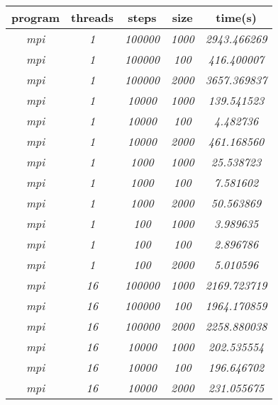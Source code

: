 \documentclass[../main.tex]{subfiles}
\begin{document}
\begin{table}[]
\begin{tabular}{|c|c|c|c|c|}
\hline
\textbf{program} & \textbf{threads} & \textbf{steps}  & \textbf{size} & \textbf{time(s)}     \\ \hline
\textit{mpi}     & \textit{1}       & \textit{100000} & \textit{1000} & \textit{2943.466269} \\
\textit{mpi}     & \textit{1}       & \textit{100000} & \textit{100}  & \textit{416.400007}  \\
\textit{mpi}     & \textit{1}       & \textit{100000} & \textit{2000} & \textit{3657.369837} \\
\textit{mpi}     & \textit{1}       & \textit{10000}  & \textit{1000} & \textit{139.541523}  \\
\textit{mpi}     & \textit{1}       & \textit{10000}  & \textit{100}  & \textit{4.482736}    \\
\textit{mpi}     & \textit{1}       & \textit{10000}  & \textit{2000} & \textit{461.168560}  \\
\textit{mpi}     & \textit{1}       & \textit{1000}   & \textit{1000} & \textit{25.538723}   \\
\textit{mpi}     & \textit{1}       & \textit{1000}   & \textit{100}  & \textit{7.581602}    \\
\textit{mpi}     & \textit{1}       & \textit{1000}   & \textit{2000} & \textit{50.563869}   \\
\textit{mpi}     & \textit{1}       & \textit{100}    & \textit{1000} & \textit{3.989635}    \\
\textit{mpi}     & \textit{1}       & \textit{100}    & \textit{100}  & \textit{2.896786}    \\
\textit{mpi}     & \textit{1}       & \textit{100}    & \textit{2000} & \textit{5.010596}    \\
\textit{mpi}     & \textit{16}      & \textit{100000} & \textit{1000} & \textit{2169.723719} \\
\textit{mpi}     & \textit{16}      & \textit{100000} & \textit{100}  & \textit{1964.170859} \\
\textit{mpi}     & \textit{16}      & \textit{100000} & \textit{2000} & \textit{2258.880038} \\
\textit{mpi}     & \textit{16}      & \textit{10000}  & \textit{1000} & \textit{202.535554}  \\
\textit{mpi}     & \textit{16}      & \textit{10000}  & \textit{100}  & \textit{196.646702}  \\
\textit{mpi}     & \textit{16}      & \textit{10000}  & \textit{2000} & \textit{231.055675}  \\

\end{tabular}
\end{table}
\end{document}
